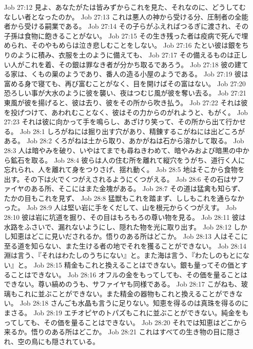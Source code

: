 Job 27:12  見よ、あなたがたは皆みずからこれを見た、それなのに、どうしてむなしい者となったのか。
Job 27:13  これは悪人の神から受ける分、圧制者の全能者から受ける嗣業である。
Job 27:14  その子らがふえればつるぎに渡され、その子孫は食物に飽きることがない。
Job 27:15  その生き残った者は疫病で死んで埋められ、そのやもめらは泣き悲しむことをしない。
Job 27:16  たとい彼は銀をちりのように積み、衣服を土のように備えても、
Job 27:17  その備えるものは正しい人がこれを着、その銀は罪なき者が分かち取るであろう。
Job 27:18  彼の建てる家は、くもの巣のようであり、番人の造る小屋のようである。
Job 27:19  彼は富める身で寝ても、再び富むことがなく、目を開けばその富はない。
Job 27:20  恐ろしい事が大水のように彼を襲い、夜はつむじ風が彼を奪い去る。
Job 27:21  東風が彼を揚げると、彼は去り、彼をその所から吹き払う。
Job 27:22  それは彼を投げつけて、あわれむことなく、彼はその力からのがれようと、もがく。
Job 27:23  それは彼に向かって手を鳴らし、あざけり笑って、その所から出て行かせる。
Job 28:1  しろがねには掘り出す穴があり、精錬するこがねには出どころがある。
Job 28:2  くろがねは土から取り、あかがねは石から溶かして取る。
Job 28:3  人は暗やみを破り、いやはてまでも尋ねきわめて、暗やみおよび暗黒の中から鉱石を取る。
Job 28:4  彼らは人の住む所を離れて縦穴をうがち、道行く人に忘れられ、人を離れて身をつりさげ、揺れ動く。
Job 28:5  地はそこから食物を出す。その下は火でくつがえされるようにくつがえる。
Job 28:6  その石はサファイヤのある所、そこにはまた金塊がある。
Job 28:7  その道は猛禽も知らず、たかの目もこれを見ず、
Job 28:8  猛獣もこれを踏まず、ししもこれを通らなかった。
Job 28:9  人は堅い岩に手をくだして、山を根元からくつがえす。
Job 28:10  彼は岩に坑道を掘り、その目はもろもろの尊い物を見る。
Job 28:11  彼は水路をふさいで、漏れないようにし、隠れた物を光に取り出す。
Job 28:12  しかし知恵はどこに見いだされるか。悟りのある所はどこか。
Job 28:13  人はそこに至る道を知らない、また生ける者の地でそれを獲ることができない。
Job 28:14  淵は言う、『それはわたしのうちにない』と。また海は言う、『わたしのもとにない』と。
Job 28:15  精金もこれと換えることはできない。銀も量ってその価とすることはできない。
Job 28:16  オフルの金をもってしても、その価を量ることはできない。尊い縞めのうも、サファイヤも同様である。
Job 28:17  こがねも、玻璃もこれに並ぶことができない。また精金の器物もこれと換えることができない。
Job 28:18  さんごも水晶も言うに足りない。知恵を得るのは真珠を得るのにまさる。
Job 28:19  エチオピヤのトパズもこれに並ぶことができない。純金をもってしても、その価を量ることはできない。
Job 28:20  それでは知恵はどこから来るか。悟りのある所はどこか。
Job 28:21  これはすべての生き物の目に隠され、空の鳥にも隠されている。

